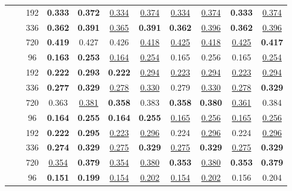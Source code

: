 \begin{table*}[!ht]
{\begin{tabular}{c|c|c|cc|cc|cc|cc}
		 & & 192 &  \textbf{0.333} & \textbf{0.372} &  \underline{0.334} & \underline{0.374} &  \underline{0.334} & \underline{0.374} &  \textbf{0.333} & \underline{0.374} \\
		 & & 336 &  \textbf{0.362} & \textbf{0.391} &  \underline{0.365} & \textbf{0.391} &  \textbf{0.362} & \underline{0.396} &  \textbf{0.362} & \underline{0.396} \\
		 & & 720 &  \textbf{0.419} & 0.427 &  0.426 & \underline{0.418} &  \underline{0.425} & \underline{0.418} &  \underline{0.425} & \textbf{0.417} \\
	\midrule
	\multirow{8}{*}{\rotatebox[origin=c]{90}{\text{ETTm2}}}
	& \multirow{4}{*}{\rotatebox[origin=c]{90}{\text{336}}}
		 & 96 &  \textbf{0.163} & \textbf{0.253} &  \underline{0.164} & \underline{0.254} &  0.165 & 0.256 &  0.165 & \underline{0.254} \\
		 & & 192 &  \textbf{0.222} & \textbf{0.293} &  \textbf{0.222} & \underline{0.294} &  \underline{0.223} & \underline{0.294} &  \underline{0.223} & \underline{0.294} \\
		 & & 336 &  \textbf{0.277} & \textbf{0.329} &  \underline{0.278} & \underline{0.330} &  0.279 & \underline{0.330} &  \underline{0.278} & \textbf{0.329} \\
		 & & 720 &  0.363 & \underline{0.381} &  \textbf{0.358} & 0.383 &  \textbf{0.358} & \textbf{0.380} &  \underline{0.361} & 0.384 \\ \cmidrule{2-11}
	& \multirow{4}{*}{\rotatebox[origin=c]{90}{\text{512}}}
		 & 96 &  \textbf{0.164} & \textbf{0.255} &  \textbf{0.164} & \textbf{0.255} &  \underline{0.165} & \underline{0.256} &  \underline{0.165} & \underline{0.256} \\
		 & & 192 &  \textbf{0.222} & \textbf{0.295} &  \underline{0.223} & \underline{0.296} &  0.224 & \underline{0.296} &  0.224 & \underline{0.296} \\
		 & & 336 &  \textbf{0.274} & \textbf{0.329} &  \underline{0.275} & \textbf{0.329} &  \underline{0.275} & \textbf{0.329} &  \underline{0.275} & \textbf{0.329} \\
		 & & 720 &  \underline{0.354} & \textbf{0.379} &  \underline{0.354} & \underline{0.380} &  \textbf{0.353} & \underline{0.380} &  \textbf{0.353} & \textbf{0.379} \\
	\midrule
	\multirow{8}{*}{\rotatebox[origin=c]{90}{\text{Weather}}}
	& \multirow{4}{*}{\rotatebox[origin=c]{90}{\text{336}}}
		 & 96 &  \textbf{0.151} & \textbf{0.199} &  \underline{0.154} & \underline{0.202} &  \underline{0.154} & \underline{0.202} &  0.156 & 0.204 \\

\end{tabular}}
\end{table*}
